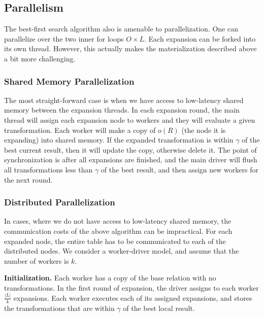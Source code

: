 \subsection{Parallelism}
The best-first search algorithm also is amenable to parallelization. One can parallelize over the two inner for loops $O \times L$. Each expansion can be forked into its own thread. However, this actually makes the materialization described above a bit more challenging. 

\subsubsection{Shared Memory Parallelization}
The most straight-forward case is when we have access to low-latency shared memory between the expansion threads. In each expansion round, the main thread will assign each expansion node to workers and they will evaluate a given transformation. Each worker will make a copy of $o(R)$ (the node it is expanding) into shared memory. 
If the expanded transformation is within $\gamma$ of the best current result, then it will update the copy, otherwise delete it. The point of synchronization is after all expansions are finished, and the main driver will flush all transformations less than $\gamma$ of the best result, and then assign new workers for the next round. 

\subsubsection{Distributed Parallelization}
In cases, where we do not have access to low-latency shared memory, the communication costs of the above algorithm can be impractical. For each expanded node, the entire table has to be communicated to each of the distributed nodes.
We consider a worker-driver model, and assume that the number of workers is $k$.

\vspace{0.25em} \noindent  \textbf{Initialization. } 
Each worker has a copy of the base relation with no transformations.
In the first round of expansion, the driver assigns to each worker $\frac{|L|}{k}$ expansions. 
Each worker executes each of its assigned expansions, and stores the transformations that are within $\gamma$ of the best local result.

